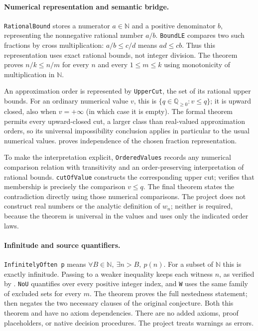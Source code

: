 \documentclass[11pt]{article}
\begin{document}
\paragraph{Numerical representation and semantic bridge.}
\texttt{RationalBound} stores a numerator $a\in\mathbb N$ and a positive
denominator $b$, representing the nonnegative rational number $a/b$.
\texttt{BoundLE} compares two such fractions by cross multiplication:
$a/b\le c/d$ means $ad\le cb$. Thus this representation uses exact
rational bounds, not integer division. The theorem
 proves $n/k\le n/m$ for every $n$ and every
$1\le m\le k$ using monotonicity of multiplication in $\mathbb N$.

An approximation order is represented by \texttt{UpperCut}, the set of
its rational upper bounds. For an ordinary numerical value $v$, this is
$\{q\in\mathbb Q_{\ge0}:v\le q\}$; it is upward closed, also when
$v=+\infty$ (in which case it is empty).
The formal theorem permits every upward-closed cut, a larger class than
real-valued approximation orders, so its universal impossibility conclusion
applies in particular to the usual numerical values.
 proves independence of the chosen
fraction representation.

To make the interpretation explicit, \texttt{OrderedValues} records any
numerical comparison relation with transitivity and an order-preserving interpretation
of rational bounds. \texttt{cutOfValue} constructs the corresponding
upper cut;  verifies that membership is precisely
the comparison $v\le q$. The final theorem 
states the contradiction directly using those numerical comparisons.
The project does not construct real numbers or the analytic definition
of $w_n$; neither is required, because the theorem is universal in the
values and uses only the indicated order laws.

\paragraph{Infinitude and source quantifiers.}
\texttt{InfinitelyOften p} means $\forall B\in\mathbb N,\ \exists n>B,\ p(n)$.
For a subset of $\mathbb N$ this is exactly infinitude. Passing to a weaker
inequality keeps each witness $n$, as verified by
. \texttt{NoU} quantifies over every positive
integer index, and \texttt{W} uses the same family of excluded sets for
every $m$. The theorem  proves the full nestedness statement;
 then negates the two necessary clauses of
the original conjecture. Both this theorem and 
have no axiom dependencies. There are no added axioms, proof placeholders,
or native decision procedures. The project treats warnings as errors.
\end{document}
